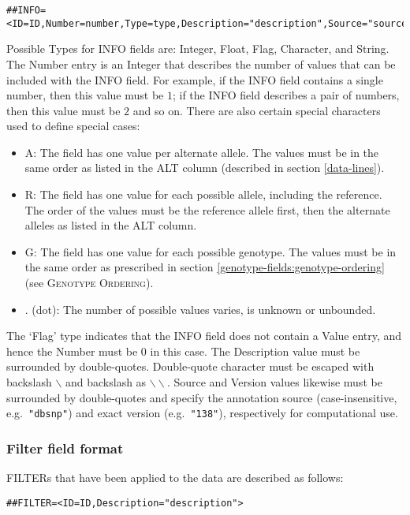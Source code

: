 \documentclass[8pt]{article}
\begin{document}
\begin{verbatim}
##INFO=<ID=ID,Number=number,Type=type,Description="description",Source="source",Version="version">
\end{verbatim}

Possible Types for INFO fields are: Integer, Float, Flag, Character, and String.
The Number entry is an Integer that describes the number of values that can be included with the INFO field.
For example, if the INFO field contains a single number, then this value must be $1$; if the INFO field describes a pair of numbers, then this value must be $2$ and so on.
There are also certain special characters used to define special cases:

\begin{itemize}
  \item A: The field has one value per alternate allele.
  The values must be in the same order as listed in the ALT column (described in section \ref{data-lines}).
  \item R: The field has one value for each possible allele, including the reference.
  The order of the values must be the reference allele first, then the alternate alleles as listed in the ALT column.
  \item G: The field has one value for each possible genotype.
  The values must be in the same order as prescribed in section \ref{genotype-fields:genotype-ordering} (see \textsc{Genotype Ordering}).
  \item . (dot): The number of possible values varies, is unknown or unbounded.
\end{itemize}

The `Flag' type indicates that the INFO field does not contain a Value entry, and hence the Number must be $0$ in this case.
The Description value must be surrounded by double-quotes.
Double-quote character must be escaped with backslash $\backslash$ and backslash as $\backslash\backslash$.
Source and Version values likewise must be surrounded by double-quotes and specify the annotation source (case-insensitive, e.g.\ \verb|"dbsnp"|) and exact version (e.g.\ \verb|"138"|), respectively for computational use.

\subsubsection{Filter field format}
FILTERs that have been applied to the data are described as follows:

\begin{verbatim}
##FILTER=<ID=ID,Description="description">
\end{verbatim}
\end{document}
